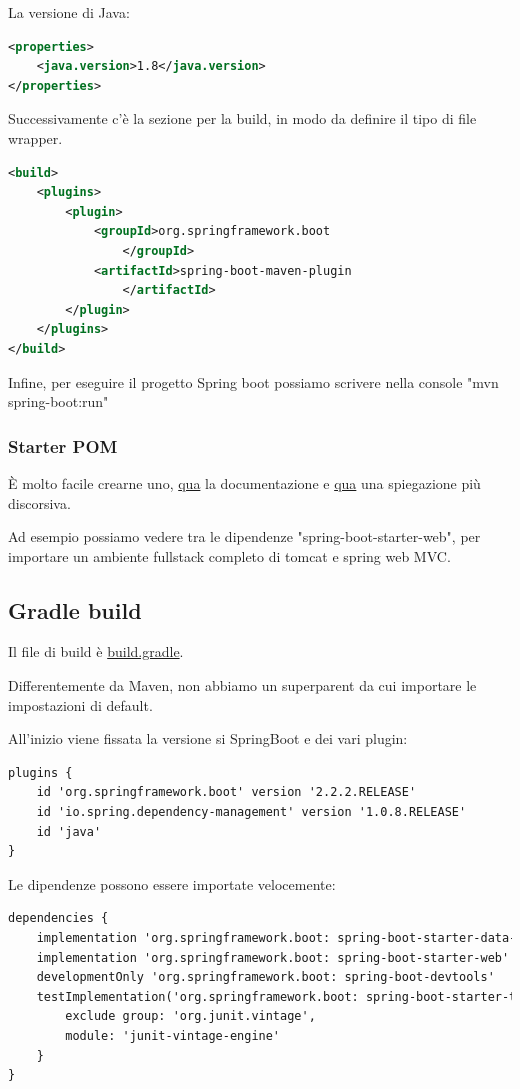 \documentclass[11pt,a4paper]{book}
\begin{document}
La versione di Java:
\begin{lstlisting}[language = XML]
<properties>
	<java.version>1.8</java.version>
</properties>
\end{lstlisting}

Successivamente c'è la sezione per la build, in modo da definire il tipo di file wrapper.
\begin{lstlisting}[language = XML]
<build>
	<plugins>
		<plugin>
			<groupId>org.springframework.boot
				</groupId>
			<artifactId>spring-boot-maven-plugin
				</artifactId>
		</plugin>
	</plugins>
</build>
\end{lstlisting}

Infine, per eseguire il progetto Spring boot possiamo scrivere nella console "mvn spring-boot:run"

\subsubsection{Starter POM}
È molto facile crearne uno, \href{https://docs.spring.io/spring-boot/docs/current-SNAPSHOT/reference/htmlsingle/#using-boot-starter}{qua} la documentazione e \href{https://www.baeldung.com/spring-boot-starters}{qua} una spiegazione più discorsiva.

Ad esempio possiamo vedere tra le dipendenze "spring-boot-starter-web", per importare un ambiente fullstack completo di tomcat e spring web MVC.

\subsection{Gradle build}
Il file di build è \href{Codici/SpringInitializr/Gradle/build.gradle}{build.gradle}.

Differentemente da Maven, non abbiamo un superparent da cui importare le impostazioni di default.

All'inizio viene fissata la versione si SpringBoot e dei vari plugin:
\begin{lstlisting}[language = XML]
plugins {
	id 'org.springframework.boot' version '2.2.2.RELEASE'
	id 'io.spring.dependency-management' version '1.0.8.RELEASE'
	id 'java'
}
\end{lstlisting}

Le dipendenze possono essere importate velocemente:
\begin{lstlisting}[language = XML]
dependencies {
	implementation 'org.springframework.boot: spring-boot-starter-data-jpa'
	implementation 'org.springframework.boot: spring-boot-starter-web'
	developmentOnly 'org.springframework.boot: spring-boot-devtools'
	testImplementation('org.springframework.boot: spring-boot-starter-test') {
		exclude group: 'org.junit.vintage', 
		module: 'junit-vintage-engine'
	}
}
\end{lstlisting}
\end{document}
